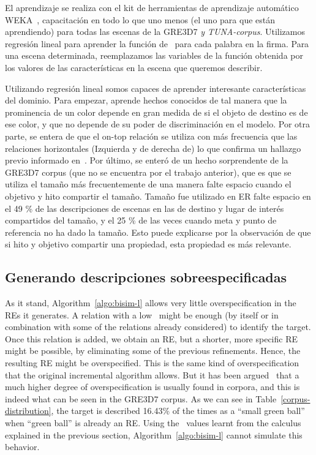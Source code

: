 El aprendizaje se realiza con el kit de herramientas de aprendizaje autom\'atico
WEKA~\cite{Hall:WEK09}, capacitaci\'on en todo lo que uno menos (el uno para que
est\'an aprendiendo) para todas las escenas de la GRE3D7 \textit{y
  TUNA-corpus}. Utilizamos regresi\'on lineal para aprender la funci\'on de
\puse\ para cada palabra en la firma. Para una escena determinada, reemplazamos
las variables de la funci\'on obtenida por los valores de las caracter\'{i}sticas
en la escena que queremos describir.

Utilizando regresi\'on lineal somos capaces de aprender interesante
caracter\'{i}sticas del dominio. Para empezar, aprende hechos conocidos
de tal manera que la prominencia de un color depende en gran medida de si el
objeto de destino es de ese color, y que no depende de su
poder de discriminaci\'on en el modelo. Por otra parte, se entera de que el on-top
relaci\'on se utiliza con m\'as frecuencia que las relaciones horizontales
(Izquierda y de derecha de) lo que confirma un hallazgo previo informado
en~\cite{viet:gene11}. Por \'ultimo, se enter\'o de un hecho sorprendente de la
GRE3D7 corpus (que no se encuentra por el trabajo anterior), que es que se utiliza el tama\~no
m\'as frecuentemente de una manera falte espacio cuando el objetivo y
hito compartir el tama\~no. Tama\~no fue utilizado en ER falte espacio en el 49 \% de
las descripciones de escenas en las de destino y lugar de inter\'es compartidos del tama\~no,
y el 25 \% de las veces cuando meta y punto de referencia no ha dado la
tama\~no. Esto puede explicarse por la observaci\'on de que si hito y
objetivo compartir una propiedad, esta propiedad es m\'as relevante.

\subsection{Generando descripciones sobreespecificadas}\label{sec:overspecification}

As it stand, Algorithm~\ref{algo:bisim-l} allows very little overspecification in the REs it
generates.  A relation with a low \puse\ might be enough 
(by itself or in combination with some of the relations already considered) to 
identify the target. Once this relation is added, we obtain an RE, but a shorter, 
more specific RE might be possible, by eliminating some of the previous refinements. 
Hence, the resulting RE might be overspecified. This is the same kind of overspecification 
that the original incremental algorithm allows.  But it has been argued~\cite{Engelhardt_Bailey_Ferreira_2006,Arts_Maes_Noordman_Jansen_2011} that 
a much higher degree of overspecification is usually found in corpora, and this 
is indeed what can be seen in the GRE3D7 corpus.  As we can see in Table~\ref{corpus-distribution}, 
the target is described 16.43\% of the times as a ``small green ball'' when ``green 
ball'' is already an RE.  Using the \puse\ values learnt from the calculus explained
in the previous section, Algorithm~\ref{algo:bisim-l} cannot simulate this behavior. 

